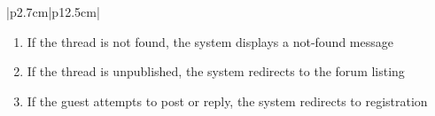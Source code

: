 \begin{table}[H]
\begin{tabular}{|p{2.7cm}|p{12.5cm}|}
\begin{minipage}[t]{\linewidth}
\begin{enumerate}[topsep=0pt,itemsep=1pt,parsep=0pt,partopsep=0pt]
                                          \item If the thread is not found, the system displays a not-found message
                                          \item If the thread is unpublished, the system redirects to the forum listing
                                          \item If the guest attempts to post or reply, the system redirects to registration
                                      \end{enumerate}
                                  \end{minipage}   \\ \hline
    \end{tabular}
    \label{tab:guest-read-thread}
\end{table}
